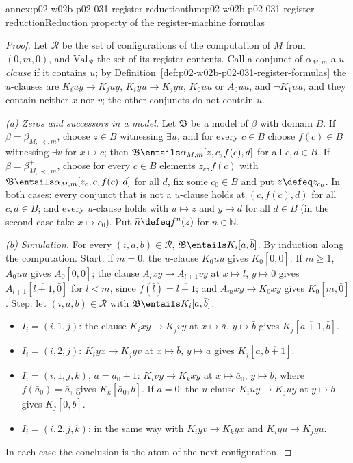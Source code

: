 \begin{annexitem}{annex:p02-w02b-p02-031-register-reduction}{thm:p02-w02b-p02-031-register-reduction}{Reduction property of the register-machine formulas}
\begin{proof}
Let \(\mathcal R\) be the set of configurations of the computation of \(M\)
from \((0,m,0)\), and \(\mathrm{Val}_{\mathcal R}\) the set of its register
contents.  Call a conjunct of \(\alpha_{M,m}\) a \emph{\(u\)-clause} if it
contains \(u\); by Definition~\ref{def:p02-w02b-p02-031-register-formulas} the
\(u\)-clauses are \(K_iuy\to K_juy\), \(K_iyu\to K_jyu\), \(K_0uu\) or
\(A_0uu\), and \(\neg K_1uu\), and they contain neither \(x\) nor \(v\); the
other conjuncts do not contain \(u\).

\emph{(a) Zeros and successors in a model.}  Let \(\mathfrak B\) be a model of
\(\beta\) with domain \(B\).  If \(\beta=\beta_{M,\prec,m}\), choose \(z\in B\)
witnessing \(\exists u\), and for every \(c\in B\) choose \(f(c)\in B\)
witnessing \(\exists v\) for \(x\mapsto c\); then \(\mathfrak B\entails
\alpha_{M,m}[z,c,f(c),d]\) for all \(c,d\in B\).  If
\(\beta=\beta^{+}_{M,\prec,m}\), choose for every \(c\in B\) elements
\(z_c,f(c)\) with \(\mathfrak B\entails\alpha_{M,m}[z_c,c,f(c),d]\) for all
\(d\), fix some \(c_0\in B\) and put \(z\defeq z_{c_0}\).  In both cases:
every conjunct that is not a \(u\)-clause holds at \((c,f(c),d)\) for all
\(c,d\in B\); and every \(u\)-clause holds with \(u\mapsto z\) and
\(y\mapsto d\) for all \(d\in B\) (in the second case take \(x\mapsto c_0\)).
Put \(\bar n\defeq f^{n}(z)\) for \(n\in\mathbb N\).

\emph{(b) Simulation.}  For every \((i,a,b)\in\mathcal R\),
\(\mathfrak B\entails K_i[\bar a,\bar b]\).  By induction along the
computation.  Start: if \(m=0\), the \(u\)-clause \(K_0uu\) gives
\(K_0[\bar0,\bar0]\).  If \(m\geq1\), \(A_0uu\) gives \(A_0[\bar0,\bar0]\); the
clause \(A_lxy\to A_{l+1}vy\) at \(x\mapsto\bar l\), \(y\mapsto\bar0\) gives
\(A_{l+1}[\overline{l+1},\bar0]\) for \(l<m\), since \(f(\bar l)=
\overline{l+1}\); and \(A_mxy\to K_0xy\) gives \(K_0[\bar m,\bar0]\).  Step:
let \((i,a,b)\in\mathcal R\) with \(\mathfrak B\entails K_i[\bar a,\bar b]\).
\begin{itemize}
\item \(I_i=(i,1,j)\): the clause \(K_ixy\to K_jvy\) at \(x\mapsto\bar a\),
      \(y\mapsto\bar b\) gives \(K_j[\overline{a+1},\bar b]\).
\item \(I_i=(i,2,j)\): \(K_iyx\to K_jyv\) at \(x\mapsto\bar b\),
      \(y\mapsto\bar a\) gives \(K_j[\bar a,\overline{b+1}]\).
\item \(I_i=(i,1,j,k)\), \(a=a_0+1\): \(K_ivy\to K_kxy\) at \(x\mapsto
      \bar a_0\), \(y\mapsto\bar b\), where \(f(\bar a_0)=\bar a\), gives
      \(K_k[\bar a_0,\bar b]\).  If \(a=0\): the \(u\)-clause \(K_iuy\to
      K_juy\) at \(y\mapsto\bar b\) gives \(K_j[\bar0,\bar b]\).
\item \(I_i=(i,2,j,k)\): in the same way with \(K_iyv\to K_kyx\) and
      \(K_iyu\to K_jyu\).
\end{itemize}
In each case the conclusion is the atom of the next configuration.


\end{proof}
\end{annexitem}
